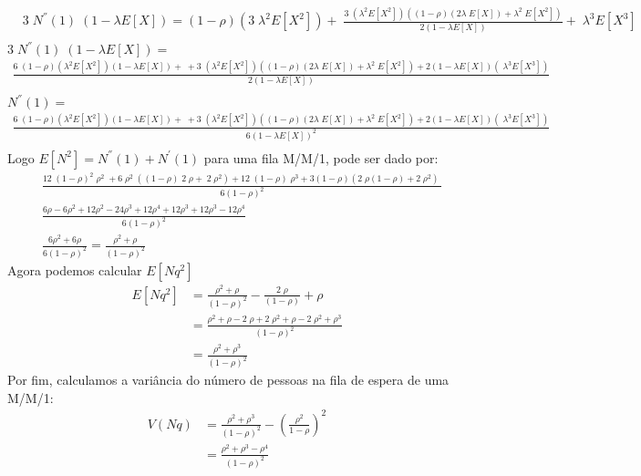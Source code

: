 \documentclass[a4paper]{article}
\begin{document}
\begin{itemize}
\begin{align*}
           &3\;N^{''}(1)\;(1-\lambda E[X])=(1-\rho)(3\;\lambda^2 E[X^2]) +\;\frac{3\;(\lambda^2 E[X^2])((1-\rho)(2\lambda\;E[X])+ \lambda^2\; E[X^2])}{2(1-\lambda E[X])} + \;\lambda^3 E[X^3] \\
    \end{align*}
    \(3\;N^{''}(1)\;(1-\lambda E[X]) = \)
    \begin{align*}
        \frac{6\;(1-\rho)(\lambda^2 E[X^2])(1-\lambda E[X]) +\;+3\;(\lambda^2 E[X^2])((1-\rho)(2\lambda\;E[X])+ \lambda^2\; E[X^2]) + 2(1-\lambda E[X]) (\;\lambda^3 E[X^3] )}{2(1-\lambda E[X])}\\
    \end{align*}
    \(N^{''}(1) = \)
    \begin{align*}
        \frac{6\;(1-\rho)(\lambda^2 E[X^2])(1-\lambda E[X]) +\;+3\;(\lambda^2 E[X^2])((1-\rho)(2\lambda\;E[X])+ \lambda^2\; E[X^2]) + 2(1-\lambda E[X]) (\;\lambda^3 E[X^3] )}{6(1-\lambda E[X])^2}\\
    \end{align*}
    Logo \(E[N^{2}] = N^{''}(1) + N^{'}(1)\) para uma fila M/M/1, pode ser dado por:
    \begin{align*}
        &\frac{12\;(1-\rho)^2\;\rho^2\;+ 6\;\rho^2\; ((1-\rho)\;2\;\rho+ \; 2\;\rho^2) + 12\;(1-\rho)\;\rho^3 + 3(1-\rho)(2\;\rho(1-\rho) + 2\;\rho^2 )\;}{6(1-\rho)^2}\\
        &\frac{6\rho-6\rho^2+12\rho^2-24\rho^3+12\rho^4+12\rho^3+12\rho^3-12\rho^4}{6(1-\rho)^2}\\
        &\frac{6\rho^2 + 6\rho}{6(1-\rho)^2} = \frac{\rho^2 + \rho}{(1-\rho)^2}
    \end{align*}
    Agora podemos calcular \(E[Nq^{2}]\)
    \begin{align*}
        E[Nq^2] &= \frac{\rho^2 + \rho}{(1-\rho)^2} -\frac{2\;\rho}{(1-\rho)} + \rho\\
        &= \frac{\rho^2 + \rho - 2\;\rho + 2\;\rho^2 + \rho - 2\;\rho^2 + \rho^3}{(1-\rho)^2}\\
         &= \frac{\rho^2 + \rho^3}{(1-\rho)^2}
    \end{align*}
    Por fim, calculamos a variância do número de pessoas na fila de espera de uma M/M/1:
    \begin{align*}
        V(Nq) &= \frac{\rho^2 + \rho^3}{(1-\rho)^2} - (\frac{\rho^2}{1-\rho})^2\\
        &=\frac{\rho^2 + \rho^3 - \rho^4}{(1-\rho)^2}
    \end{align*}
\end{itemize}
\end{document}
